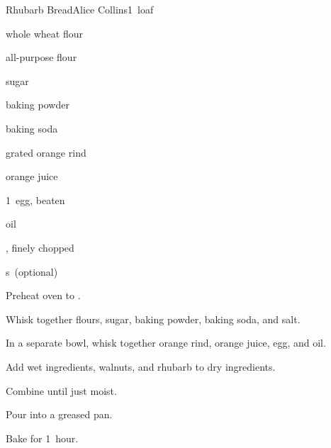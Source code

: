 \begin{recipe}{Rhubarb Bread\UNTESTED}{Alice Collins}{1~loaf}

\begin{ingredients}
\item {} whole wheat flour
\item {} all-purpose flour
\item \C{\threequarter} sugar
\item \tp{1\half} baking powder
\item \tp{1\half} baking soda
\item {} grated orange rind
\item \C{\threequarter} orange juice
\item 1~egg, beaten
\item {} oil
\item \C{1\half} , finely chopped
\item \C{\half} s~(optional)
\end{ingredients}

\begin{directions}
\item Preheat oven to .
\item Whisk together flours, sugar, baking powder, baking soda, and salt.
\item In a separate bowl, whisk together orange rind, orange juice, egg, and oil.
\item Add wet ingredients, walnuts, and rhubarb to dry ingredients.
\item Combine until just moist.
\item Pour into a greased pan.
\item Bake for 1~hour.
\end{directions}

\end{recipe}
